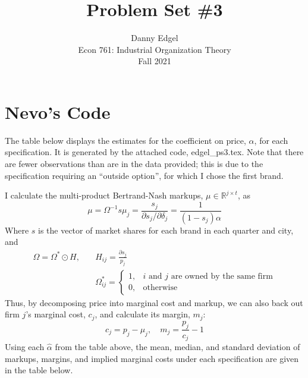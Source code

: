 \documentclass{article}
\newcommand{\R}{\mathbb{R}}
\newcommand{\pl}{\partial}
\begin{document}
\title{	Problem Set \#3 }
\author{ 	Danny Edgel 					        	      \\ 
			Econ 761: Industrial Organization Theory	\\
			Fall 2021						                      \\
		}
\maketitle\thispagestyle{empty}



\section{Nevo's Code}

The table below displays the estimates for the coefficient on price, $\alpha$, for each specification. It is generated by the attached code, edgel\_ps3.tex. Note that there are fewer observations than are in the data provided; this is due to the specification requiring an ``outside option'', for which I chose the first brand.
\begin{center}
        
\end{center}
I calculate the multi-product Bertrand-Nash markups, $\mu\in\R^{j\times t}$, as\[ 
        \mu = \Omega^{-1}s
        \mu_j = \frac{s_j}{\pl s_j / \pl\delta_j} = \frac{1}{(1-s_j)\alpha}
\]
Where ${s}$ is the vector of market shares for each brand in each quarter and city, and \begin{align*}
        \Omega = \Omega^*\odot H,\quad &H_{ij} = \frac{\pl s_j}{p_j}    \\
        &\Omega^*_{ij} =  \begin{cases} 1, & i\text{ and }j\text{ are owned by the same firm} \\ 0, &\text{otherwise} \end{cases}
\end{align*}
Thus, by decomposing price into marginal cost and markup, we can also back out firm $j$'s marginal cost, $c_j$, and calculate its margin, $m_j$: \[
        c_j = p_j - \mu_j,\quad m_j = \frac{p_j}{c_j} - 1
\]
Using each $\hat{\alpha}$ from the table above, the mean, median, and standard deviation of markups, margins, and implied marginal costs under each specification are given in the table below.
\begin{center}
        
\end{center}
\end{document}

